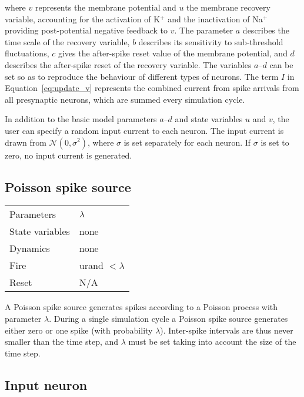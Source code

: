 \documentclass[a4paper]{article}
\begin{document}
where $v$ represents the membrane potential
	and $u$ the membrane recovery variable,
	accounting for the activation of K$^+$
	and the inactivation of Na$^+$ 
	providing post-potential negative feedback to $v$.
The parameter $a$ describes the time scale of the recovery variable, 
	$b$ describes its sensitivity to sub-threshold fluctuations, 
	$c$ gives the after-spike reset value of the membrane potential, 
	and $d$ describes the after-spike reset of the recovery variable. 
The variables $a$--$d$ can be set so as to reproduce the behaviour of different types of neurons.
The term $I$ in Equation~\ref{eq:update_v} represents the combined 
	current from spike arrivals from all presynaptic neurons,
	which are summed every simulation cycle.

In addition to the basic model parameters $a$--$d$ and state variables $u$ and $v$,
	the user can specify a random input current to each neuron. 
The input current is drawn from $\mathcal{N}(0, \sigma^2)$,
	where $\sigma$ is set separately for each neuron.
If $\sigma$ is set to zero, no input current is generated.

\subsection{Poisson spike source}
\label{model:neuron:poisson}

\begin{tabular}{ll}
Parameters	    & $\lambda$         \\
State variables & none              \\
Dynamics        & none              \\
Fire            & urand $< \lambda$ \\
Reset           & N/A               \\
\end{tabular}

A Poisson spike source generates spikes according to a Poisson process with parameter $\lambda$.
During a single simulation cycle a Poisson spike source generates either zero or one spike (with probability $\lambda$).
Inter-spike intervals are thus never smaller than the time step,
	and $\lambda$ must be set taking into account the size of the time step.


\subsection{Input neuron}
\label{model:neuron:input}
\end{document}
